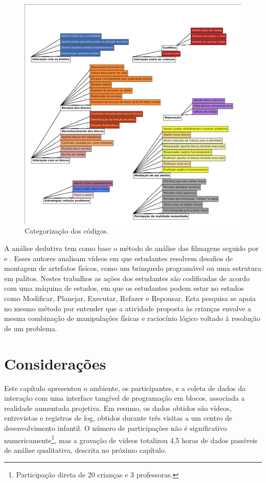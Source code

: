 \begin{figure}[!htpb]
    \centering
    \includegraphics[width=1\linewidth,fbox]{figs/categorias.png}
    \caption{Categorização dos códigos.}
    \sourceauthor
    \label{fig:codificacao}
\end{figure}

A análise dedutiva tem como base o método de análise das filmagens seguido por  e . Esses autores analisam vídeos em que estudantes resolvem desafios de montagem de artefatos físicos, como um brinquedo programável ou uma estrutura em palitos. Nestes trabalhos as ações dos estudantes são codificadas de acordo com uma máquina de estados, em que os estudantes podem estar no estados como Modificar, Planejar, Executar, Refazer e Repousar. Esta pesquisa se apoia no mesmo método por entender que a atividade proposta às crianças envolve a mesma combinação de manipulações físicas e raciocínio lógico voltado à resolução de um problema.

\section{Considerações}

Este capítulo apresentou o ambiente, os participantes, e a coleta de dados da interação com uma interface tangível de programação em blocos, associada a realidade aumentada projetiva. Em resumo, os dados obtidos são vídeos, entrevistas e registros de log, obtidos durante três visitas a um centro de desenvolvimento infantil. O número de participações não é significativo numericamente\footnote{Participação direta de 20 crianças e 3 professoras.}, mas a gravação de vídeos totalizou 4,5 horas de dados passíveis de análise qualitativa, descrita no próximo capítulo.